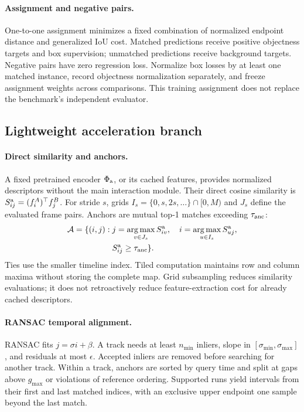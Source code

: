 \paragraph{Assignment and negative pairs.}
One-to-one assignment minimizes a fixed combination of normalized endpoint distance
and generalized IoU cost. Matched predictions receive positive objectness targets and
box supervision; unmatched predictions receive background targets. Negative pairs have
zero regression loss. Normalize box losses by at least one matched instance, record
objectness normalization separately, and freeze assignment weights across comparisons.
This training assignment does not replace the benchmark's independent evaluator.

\subsection{Lightweight acceleration branch}
\label{sec:acceleration}
\paragraph{Direct similarity and anchors.}
A fixed pretrained encoder $\Phi_{\rm a}$, or its cached features, provides normalized
descriptors without the main interaction module. Their direct cosine similarity is
$S^{\rm a}_{ij}=(f_i^A)^\top f_j^B$. For stride $s$, grids
$I_s=\{0,s,2s,\ldots\}\cap[0,M)$ and $J_s$ define the evaluated frame pairs. Anchors are
mutual top-1 matches exceeding $\tau_{\rm anc}$:
\begin{equation}
\begin{split}
\mathcal A=\{(i,j):\;&j=\operatorname*{arg\,max}_{v\in J_s}S^{\rm a}_{iv},\quad
i=\operatorname*{arg\,max}_{u\in I_s}S^{\rm a}_{uj},\\
&S^{\rm a}_{ij}\ge\tau_{\rm anc}\}.
\end{split}
\label{eq:anchors}
\end{equation}
Ties use the smaller timeline index. Tiled computation maintains row and column maxima
without storing the complete map. Grid subsampling reduces similarity evaluations; it does
not retroactively reduce feature-extraction cost for already cached descriptors.

\paragraph{RANSAC temporal alignment.}
RANSAC fits $j=\sigma i+\beta$. A track needs at least $n_{\min}$ inliers, slope in
$[\sigma_{\min},\sigma_{\max}]$, and residuals at most $\epsilon$. Accepted inliers are
removed before searching for another track. Within a track, anchors are sorted by query time
and split at gaps above $g_{\max}$ or violations of reference ordering. Supported runs yield
intervals from their first and last matched indices, with an exclusive upper endpoint one
sample beyond the last match.

